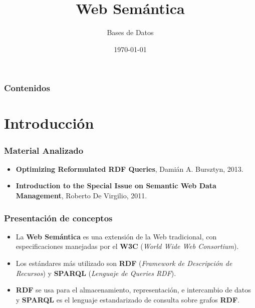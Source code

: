 \documentclass{beamer}
\title[Presentación del TP2]{Web Semántica} %
\author{Bases de Datos} %
\institute[] %
{
Federico Allocati, Sabrina Izcovich, Santiago Pernigotti, Germán Romano\\ %
\medskip
}
\date{\today} %
\begin{document}
\begin{frame}
\titlepage %
\end{frame}

\begin{frame}
\frametitle{Contenidos} %
\tableofcontents %
\end{frame}


\section{Introducción} 
\begin{frame}
\frametitle{Material Analizado}
\begin{itemize}
\item \textbf{Optimizing Reformulated RDF Queries}, Damián A. Bursztyn, 2013.

\item \textbf{Introduction to the Special Issue on Semantic Web Data Management}, Roberto De Virgilio, 2011.
\end{itemize}
\end{frame}


\begin{frame}
\frametitle{Presentación de conceptos}
\begin{itemize}
\item La \textbf{Web Semántica} es una extensión de la Web tradicional, con especificaciones manejadas por el \textbf{W3C} (\textit{World Wide Web Consortium}).

\item Los estándares más utilizado son \textbf{RDF} (\textit{Framework de Descripción de Recursos}) y \textbf{SPARQL} (\textit{Lenguaje de Queries RDF}).

\item \textbf{RDF} se usa para el almacenamiento, representación, e intercambio de datos y \textbf{SPARQL} es el lenguaje estandarizado de consulta sobre grafos \textbf{RDF}.
\end{itemize}
\end{frame}
\end{document}
